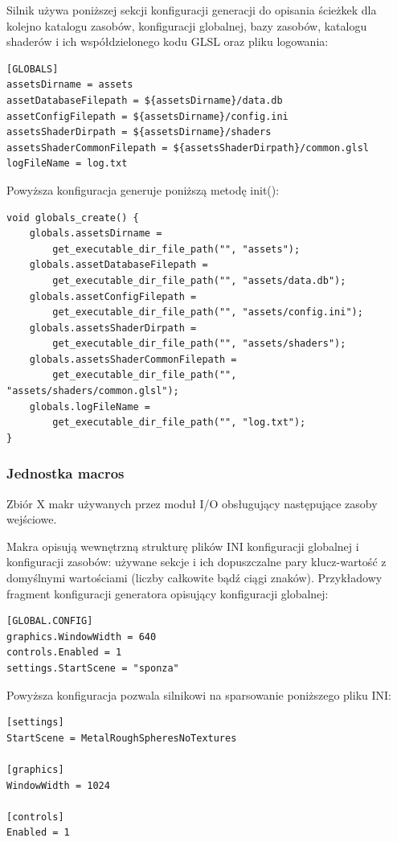 Silnik używa poniższej sekcji konfiguracji generacji do opisania ścieżkek dla kolejno katalogu zasobów, konfiguracji globalnej, bazy zasobów, katalogu shaderów i ich współdzielonego kodu GLSL oraz pliku logowania:
\lstset{language=verbatim}
\begin{lstlisting}[caption={Konfiguracja generacji zmiennych},captionpos=b]
[GLOBALS]
assetsDirname = assets
assetDatabaseFilepath = ${assetsDirname}/data.db
assetConfigFilepath = ${assetsDirname}/config.ini
assetsShaderDirpath = ${assetsDirname}/shaders
assetsShaderCommonFilepath = ${assetsShaderDirpath}/common.glsl
logFileName = log.txt
\end{lstlisting}
Powyższa konfiguracja generuje poniższą metodę init():
\lstset{language=C}
\begin{lstlisting}[caption={Wynik generacji zmiennych},captionpos=b]
void globals_create() {
	globals.assetsDirname =
		get_executable_dir_file_path("", "assets");
	globals.assetDatabaseFilepath =
		get_executable_dir_file_path("", "assets/data.db");
	globals.assetConfigFilepath =
		get_executable_dir_file_path("", "assets/config.ini");
	globals.assetsShaderDirpath =
		get_executable_dir_file_path("", "assets/shaders");
	globals.assetsShaderCommonFilepath =
  		get_executable_dir_file_path("", "assets/shaders/common.glsl");
	globals.logFileName =
		get_executable_dir_file_path("", "log.txt");
}
\end{lstlisting}

\subsubsection{Jednostka macros}
Zbiór X makr używanych przez moduł I/O obsługujący następujące zasoby wejściowe.

Makra opisują wewnętrzną strukturę plików INI konfiguracji globalnej i konfiguracji zasobów: używane sekcje i ich dopuszczalne pary klucz-wartość z domyślnymi wartościami (liczby całkowite bądź ciągi znaków).
Przykładowy fragment konfiguracji generatora opisujący konfiguracji globalnej:
\lstset{language=verbatim}
\begin{lstlisting}[caption={Konfiguracja generacji konfiguracji globalnej},captionpos=b]
[GLOBAL.CONFIG]
graphics.WindowWidth = 640
controls.Enabled = 1
settings.StartScene = "sponza"
\end{lstlisting}
Powyższa konfiguracja pozwala silnikowi na sparsowanie poniższego pliku INI:
\lstset{language=verbatim}
\begin{lstlisting}[caption={Przykładowa konfiguracja globalna},captionpos=b]
[settings]
StartScene = MetalRoughSpheresNoTextures

[graphics]
WindowWidth = 1024

[controls]
Enabled = 1 
\end{lstlisting}

